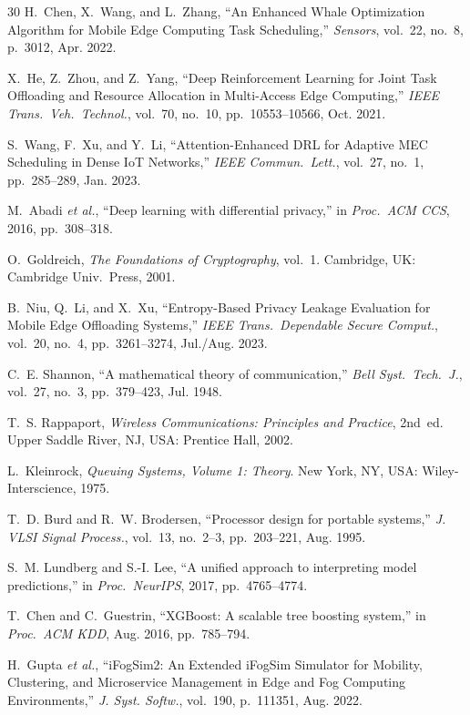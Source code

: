 \documentclass[journal]{IEEEtran}
\begin{document}
\begin{thebibliography}{30}
H.~Chen, X.~Wang, and L.~Zhang,
``An Enhanced Whale Optimization Algorithm for Mobile Edge
Computing Task Scheduling,''
\emph{Sensors}, vol.~22, no.~8, p.~3012, Apr. 2022.

X.~He, Z.~Zhou, and Z.~Yang,
``Deep Reinforcement Learning for Joint Task Offloading and
Resource Allocation in Multi-Access Edge Computing,''
\emph{IEEE Trans.\ Veh.\ Technol.}, vol.~70, no.~10,
pp.~10553--10566, Oct. 2021.

S.~Wang, F.~Xu, and Y.~Li,
``Attention-Enhanced DRL for Adaptive MEC Scheduling in Dense
IoT Networks,''
\emph{IEEE Commun.\ Lett.}, vol.~27, no.~1, pp.~285--289, Jan. 2023.

M.~Abadi \emph{et al.},
``Deep learning with differential privacy,''
in \emph{Proc.\ ACM CCS}, 2016, pp.~308--318.

O.~Goldreich,
\emph{The Foundations of Cryptography}, vol.~1.
Cambridge, UK: Cambridge Univ.\ Press, 2001.

B.~Niu, Q.~Li, and X.~Xu,
``Entropy-Based Privacy Leakage Evaluation for Mobile Edge
Offloading Systems,''
\emph{IEEE Trans.\ Dependable Secure Comput.}, vol.~20, no.~4,
pp.~3261--3274, Jul./Aug. 2023.

C.~E. Shannon,
``A mathematical theory of communication,''
\emph{Bell Syst.\ Tech.\ J.}, vol.~27, no.~3, pp.~379--423,
Jul. 1948.

T.~S. Rappaport,
\emph{Wireless Communications: Principles and Practice}, 2nd~ed.
Upper Saddle River, NJ, USA: Prentice Hall, 2002.

L.~Kleinrock,
\emph{Queuing Systems, Volume 1: Theory}.
New York, NY, USA: Wiley-Interscience, 1975.

T.~D. Burd and R.~W. Brodersen,
``Processor design for portable systems,''
\emph{J. VLSI Signal Process.}, vol.~13, no.~2--3,
pp.~203--221, Aug. 1995.

S.~M. Lundberg and S.-I. Lee,
``A unified approach to interpreting model predictions,''
in \emph{Proc.\ NeurIPS}, 2017, pp.~4765--4774.

T.~Chen and C.~Guestrin,
``XGBoost: A scalable tree boosting system,''
in \emph{Proc.\ ACM KDD}, Aug. 2016, pp.~785--794.

H.~Gupta \emph{et al.},
``iFogSim2: An Extended iFogSim Simulator for Mobility, Clustering,
and Microservice Management in Edge and Fog Computing Environments,''
\emph{J. Syst. Softw.}, vol.~190, p.~111351, Aug. 2022.


\end{thebibliography}
\end{document}
